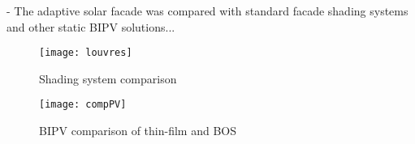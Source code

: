 
- The adaptive solar facade was compared with standard facade shading systems and other static BIPV solutions...

\begin{figure}[H]
\begin{center}
\texttt{[image: louvres]}
\caption{Shading system comparison}
\label{fig:louvres}
\end{center}
\end{figure}

\begin{figure}[H]
\begin{center}
\texttt{[image: compPV]}
\caption{BIPV comparison of thin-film and BOS}
\label{fig:compPV}
\end{center}
\end{figure}
